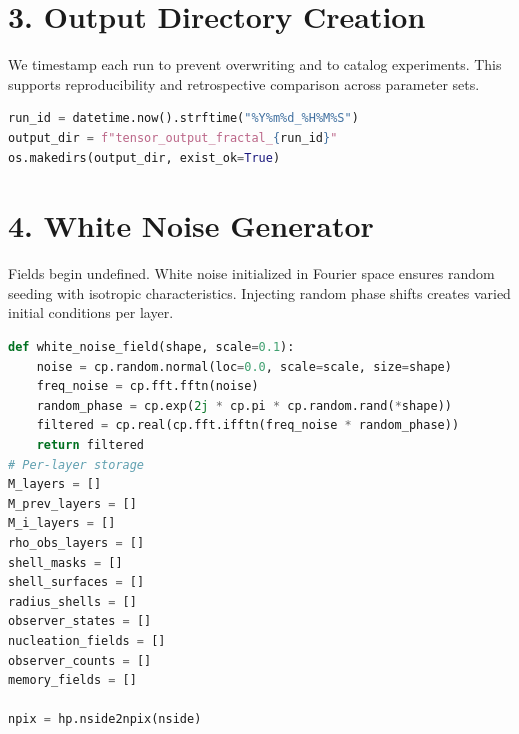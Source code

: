 \section*{3. Output Directory Creation}
We timestamp each run to prevent overwriting and to catalog experiments. This supports reproducibility and retrospective comparison across parameter sets.
\begin{lstlisting}[language=Python]
run_id = datetime.now().strftime("%Y%m%d_%H%M%S")
output_dir = f"tensor_output_fractal_{run_id}"
os.makedirs(output_dir, exist_ok=True)
\end{lstlisting}

\section*{4. White Noise Generator}
Fields begin undefined. White noise initialized in Fourier space ensures random seeding with isotropic characteristics. Injecting random phase shifts creates varied initial conditions per layer.
\begin{lstlisting}[language=Python]
def white_noise_field(shape, scale=0.1):
    noise = cp.random.normal(loc=0.0, scale=scale, size=shape)
    freq_noise = cp.fft.fftn(noise)
    random_phase = cp.exp(2j * cp.pi * cp.random.rand(*shape))
    filtered = cp.real(cp.fft.ifftn(freq_noise * random_phase))
    return filtered
# Per-layer storage
M_layers = []
M_prev_layers = []
M_i_layers = []
rho_obs_layers = []
shell_masks = []
shell_surfaces = []
radius_shells = []
observer_states = []
nucleation_fields = []
observer_counts = []
memory_fields = []

npix = hp.nside2npix(nside)

\end{lstlisting}

